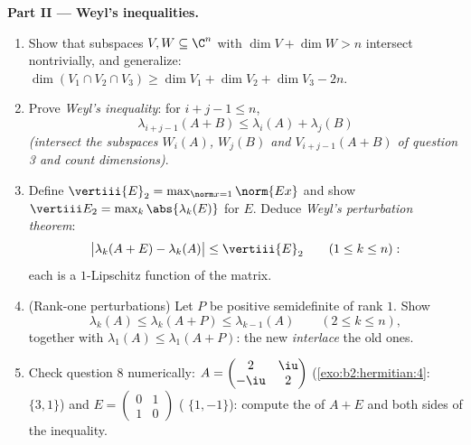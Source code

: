 \begin{problem}
\medskip
\noindent\textbf{Part II --- Weyl's inequalities.}
\begin{enumerate}[resume]
  \item Show that subspaces $V, W \subseteq \C^n$ with $\dim V
        + \dim W > n$ intersect nontrivially, and generalize:
        $\dim(V_1 \cap V_2 \cap V_3) \geq \dim V_1 + \dim V_2 +
        \dim V_3 - 2n$.
  \item Prove \emph{Weyl's inequality}: for $i + j - 1 \leq n$,
        \[
        \lambda_{i+j-1}(A + B) \leq \lambda_i(A) +
        \lambda_j(B)
        \]
        \emph{(intersect the subspaces $W_i(A)$, $W_j(B)$ and
        $V_{i+j-1}(A+B)$ of question 3 and count
        dimensions)}.
  \item Define $\vertiii{E}_2 = \max_{\norm x = 1}\norm{Ex}$
        and show $\vertiii E_2 = \max_k\abs{\lambda_k(E)}$ for
         $E$. Deduce \emph{Weyl's perturbation
        theorem}:
        \[
        \bigl|\lambda_k(A + E) - \lambda_k(A)\bigr| \leq
        \vertiii{E}_2
        \qquad (1 \leq k \leq n) :
        \]
        each  is a $1$-Lipschitz function of the
        matrix.
  \item (Rank-one perturbations) Let $P$ be  positive
        semidefinite of rank $1$. Show
        \[
        \lambda_k(A) \leq \lambda_k(A + P) \leq
        \lambda_{k-1}(A) \qquad (2 \leq k \leq n),
        \]
        together with $\lambda_1(A) \leq \lambda_1(A+P)$: the
        new  \emph{interlace} the old ones.
  \item Check question 8 numerically: $A = \begin{pmatrix} 2 &
        \iu\\ -\iu & 2\end{pmatrix}$
        (\cref{exo:b2:hermitian:4}:  $\{3, 1\}$) and
        $E = \begin{pmatrix} 0 & 1\\ 1 & 0\end{pmatrix}$
        ( $\{1, -1\}$): compute the  of $A +
        E$ and both sides of the inequality.
\end{enumerate}


\end{problem}

